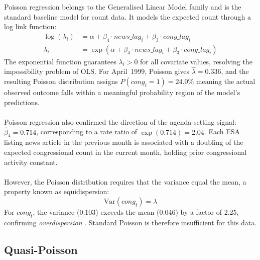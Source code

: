 \documentclass[11pt]{article}
\begin{document}
Poisson regression belongs to the Generalised Linear Model family \citep{Nelder1972, McCullagh1989} and is the standard baseline model for count data. It models the expected count through a log link function:
\begin{align}
  \log(\lambda_i) &= \alpha + \beta_4 \cdot \mathit{news\_lag}_i
             + \beta_3 \cdot \mathit{cong\_lag}_i
  \label{eq:poisson_link}\\
  \lambda_i &= \exp(\alpha + \beta_4 \cdot \mathit{news\_lag}_i
        + \beta_3 \cdot \mathit{cong\_lag}_i)
  \label{eq:poisson_mean}
\end{align}
The exponential function guarantees $\lambda_i > 0$ for all covariate values, resolving the impossibility problem of OLS. For April~1999, Poisson gives $\hat{\lambda} = 0.336$, and the resulting Poisson
distribution assigns $P(\mathit{cong}_t = 1) = 24.0\%$ meaning the actual observed outcome falls within a meaningful probability region of the model's predictions.\\
\\
Poisson regression also confirmed the direction of the agenda-setting signal: $\hat{\beta}_4 = 0.714$, corresponding to a rate ratio of $\exp(0.714) = 2.04$. Each ESA listing news article in the previous month is associated with a doubling of the expected congressional count in the current month, holding prior congressional activity constant.\\
\\
However, the Poisson distribution requires that the variance equal the mean, a property known as equidispersion:
\begin{equation}
  \mathrm{Var}(\mathit{cong}_t) = \lambda
  \label{eq:equidispersion}
\end{equation}
For $\mathit{cong}_t$, the variance (0.103) exceeds the mean (0.046) by a factor of 2.25, confirming \textit{overdispersion} \citep{Cameron1998, Hilbe2011}. 
Standard Poisson is therefore insufficient for this data.

\subsection{Quasi-Poisson}
\end{document}
